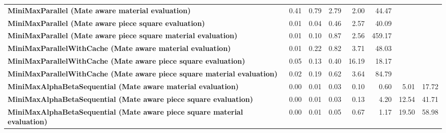\begin{table}[H]
{\begin{tabular}{|p{8cm}|*{7}{r|}}
            \rowcolor[HTML]{FFFFFF}
            \textbf{MiniMaxParallel (Mate aware material evaluation)}                                  & 0.41                                  & 0.79                                  & 2.79                                  & 2.00                                  & 44.47 &  &  \\
            \rowcolor[HTML]{EFEFEF}
            \textbf{MiniMaxParallel (Mate aware piece square evaluation)}                              & 0.01                                  & 0.04                                  & 0.46                                  & 2.57 & 40.09 &  &  \\
            \rowcolor[HTML]{FFFFFF}
            \textbf{MiniMaxParallel (Mate aware piece square material evaluation)}                     & 0.01                                  & 0.10 & 0.87 & 2.56 & 459.17 &  &  \\

            \rowcolor[HTML]{EFEFEF}
            \textbf{MiniMaxParallelWithCache (Mate aware material evaluation)}                         & 0.01                                  & 0.22                                  & 0.82 & 3.71 & 48.03 &  &  \\
            \rowcolor[HTML]{FFFFFF}
            \textbf{MiniMaxParallelWithCache (Mate aware piece square evaluation)}                     & 0.05                                  & 0.13 & 0.40 & 16.19 & 18.17 &  &  \\
            \rowcolor[HTML]{EFEFEF}
            \textbf{MiniMaxParallelWithCache (Mate aware piece square material evaluation)}            & 0.02 & 0.19 & 0.62 & 3.64 & 84.79 &  &  \\

            \rowcolor[HTML]{FFFFFF}
            \textbf{MiniMaxAlphaBetaSequential (Mate aware material evaluation)}                       & 0.00                                  & 0.01                                  & 0.03 & 0.10 & 0.60 & 5.01 & 17.72 \\
            \rowcolor[HTML]{EFEFEF}
            \textbf{MiniMaxAlphaBetaSequential (Mate aware piece square evaluation)}                   & 0.00                                  & 0.01 & 0.03 & 0.13 & 4.20 & 12.54 & 41.71 \\
            \rowcolor[HTML]{FFFFFF}
            \textbf{MiniMaxAlphaBetaSequential (Mate aware piece square material evaluation)}               & 0.00 & 0.01 & 0.05 & 0.67 & 1.17 & 19.50 & 58.98 \\


\end{tabular}}
\end{table}
